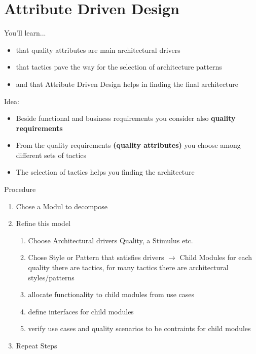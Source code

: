 \hypertarget{attribute-driven-design}{%
\section{Attribute Driven Design}\label{attribute-driven-design}}


\begin{tcolorbox}[colback=blue!5!white,colframe=blue!75!black]
You’ll learn...
\begin{itemize}
    \item that quality attributes are main architectural drivers
    \item that tactics pave the way for the selection of architecture patterns
    \item and that Attribute Driven Design helps in finding the final architecture
\end{itemize}
\end{tcolorbox}

Idea:

\begin{itemize}
\tightlist
\item
  Beside functional and business requirements you consider also
  \textbf{quality requirements}
\item
  From the quality requirements \textbf{(quality attributes)} you choose
  among different sets of tactics
\item
  The selection of tactics helps you finding the architecture
\end{itemize}


Procedure
\begin{enumerate}
    \item Chose a Modul to decompose
    \item Refine this model
    \begin{enumerate}
        \item Choose Architectural drivers
        \subitem Quality, a Stimulus etc.
        \item Chose Style or Pattern that satisfies drivers $\rightarrow$ Child Modules
        \subitem for each quality there are tactics, for many tactics there are architectural styles/patterns
        \item allocate functionality to child modules from use cases
        \item define interfaces for child modules
        \item verify use cases and quality scenarios to be contraints for child modules
    \end{enumerate}
    \item Repeat Steps
\end{enumerate}





